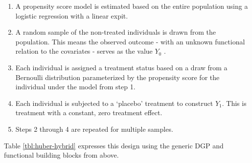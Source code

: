 \documentclass[../main.tex]{subfiles}
\begin{document}
\vspace{\baselineskip}
\begin{enumerate}
    \item A propensity score model is estimated based on the entire population using a logistic regression with a linear expit.\par

    \item A random sample of the non-treated individuals is drawn from the population. This means the observed outcome - with an unknown functional relation to the covariates - serves as the value  \( Y_{0} \) .\par

    \item Each individual is assigned a treatment status based on a draw from a Bernoulli distribution parameterized by the propensity score for the individual under the model from step 1.\par

    \item Each individual is subjected to a ‘placebo’ treatment to construct  \( Y_{1}. \) This is treatment with a constant, zero treatment effect.\par

    \item Steps 2 through 4 are repeated for multiple samples.
\end{enumerate}\par


\vspace{\baselineskip}
Table \ref{tbl:huber-hybrid} expresses this design using the generic DGP and functional building blocks from above.\par


\vspace{\baselineskip}


\end{document}
